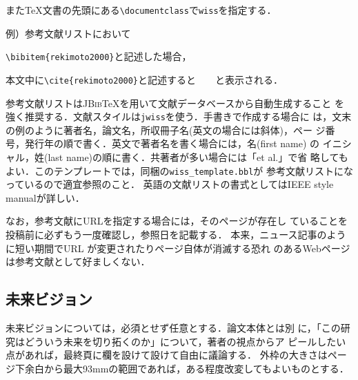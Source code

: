 また\TeX 文書の先頭にある\verb|\documentclass|で\verb|wiss|を指定する．
\begin{document}
例）参考文献リストにおいて

\verb|\bibitem{rekimoto2000}|と記述した場合，

本文中に\verb|\cite{rekimoto2000}|と記述すると　\cite{rekimoto2000}　と表示される．

参考文献リストは\textsc{JBib}\TeX を用いて文献データベースから自動生成すること
を強く推奨する．文献スタイルは\verb|jwiss|を使う．手書きで作成する場合に
は，文末の例のように著者名，論文名，所収冊子名(英文の場合には斜体)，ペー
ジ番号，発行年の順で書く．英文で著者名を書く場合には，名(first name) の
イニシャル，姓(last name)の順に書く．共著者が多い場合には「et al.」で省
略してもよい．このテンプレートでは，同梱の\verb|wiss_template.bbl|が
参考文献リストになっているので適宜参照のこと．
英語の文献リストの書式としてはIEEE style manual\cite{IEEE2014}が詳しい．

なお，参考文献にURLを指定する場合には，そのページが存在し
ていることを投稿前に必ずもう一度確認し，参照日を記載する．
本来，ニュース記事のように短い期間でURL が変更されたりページ自体が消滅する恐れ
のあるWebページは参考文献として好ましくない．

\subsection{未来ビジョン}
未来ビジョンについては，必須とせず任意とする．論文本体とは別
に，「この研究はどういう未来を切り拓くのか」について，著者の視点からア
ピールしたい点があれば，最終頁に欄を設けて設けて自由に議論する．
外枠の大きさはページ下余白から最大93mmの範囲であれば，ある程度改変してもよいものとする．
\end{document}
